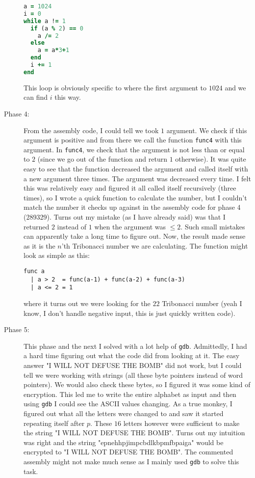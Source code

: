 \documentclass[a4paper]{article}
\begin{document}
\begin{description}
\begin{lstlisting}[language=Ruby]
a = 1024
i = 0
while a != 1
  if (a % 2) == 0
    a /= 2
  else
    a = a*3+1
  end
  i += 1
end
\end{lstlisting}
This loop is obviously specific to where the first argument to $1024$ and we can find $i$ this way.
  \item[Phase 4:] From the assembly code, I could tell we took $1$ argument. We check if this argument is positive and from there we call the function \texttt{func4} with this argument. In \texttt{func4}, we check that the argument is not less than or equal to $2$ (since we go out of the function and return $1$ otherwise). It was quite easy to see that the function decreased the argument and called itself with a new argument three times. The argument was decreased every time. I felt this was relatively easy and figured it all called itself recursively (three times), so I wrote a quick function to calculate the number, but I couldn't match the number it checks up against in the assembly code for phase 4 (289329). Turns out my mistake (as I have already said) was that I returned $2$ instead of $1$ when the argument was $\leq 2$. Such small mistakes can apparently take a long time to figure out. Now, the result made sense as it is the $n$'th Tribonacci number we are calculating. The function might look as simple as this:
\begin{lstlisting}
func a
  | a > 2  = func(a-1) + func(a-2) + func(a-3)
  | a <= 2 = 1
\end{lstlisting}
where it turns out we were looking for the $22$ Tribonacci number (yeah I know, I don't handle negative input, this is just quickly written code).
  \item[Phase 5:] This phase and the next I solved with a lot help of \texttt{gdb}. Admittedly, I had a hard time figuring out what the code did from looking at it. The easy answer "I WILL NOT DEFUSE THE BOMB" did not work, but I could tell we were working with strings (all these byte pointers instead of word pointers). We would also check these bytes, so I figured it was some kind of encryption. This led me to write the entire alphabet as input and then using \texttt{gdb} I could see the ASCII values changing. As a true monkey, I figured out what all the letters were changed to and saw it started repeating itself after $p$. These $16$ letters however were sufficient to make the string "I WILL NOT DEFUSE THE BOMB". Turns out my intuition was right and the string "epnehhpjimpcbdlkbpmfbpaiga" would be encrypted to "I WILL NOT DEFUSE THE BOMB". The commented assembly might not make much sense as I mainly used \texttt{gdb} to solve this task.

\end{description}
\end{document}
